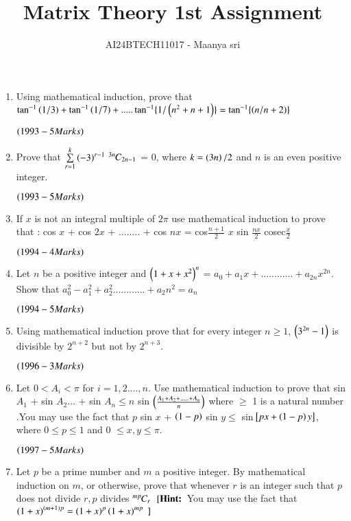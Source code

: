 \documentclass[journal,12pt,twocolumn]{IEEEtran}
\theoremstyle{remark}
\begin{document}

\vspace{3cm}

\title{Matrix Theory 1st Assignment}
\author{AI24BTECH11017 - Maanya sri}
\maketitle
\newpage
\bigskip

\renewcommand{\thefigure}{\theenumi}
\renewcommand{\thetable}{\theenumi}\begin{enumerate}[start=16] 
\item Using mathematical induction, prove that $\tan^{-1}\left(1/3\right)  +  \tan^{-1}\left(1/7\right) + .....\tan^{-1}\{1/\left(n^2 + n + 1\right)\} = \tan^{-1}\{\left(n/n+2\right)\}$ 

$\hfill\textcolor{black}{\brak{1993-5 Marks} }$
\item Prove that $\sum\limits^{k}_{r=1} \left(-3\right)^{r-1}$ ${{}^{3n}\mkern-1muC_{2n-1}}$ = $0$, where $k=\left(3n\right)/2$ and $n$ is an even positive integer.

$\hfill\textcolor{black}{\brak{1993-5 Marks} }$
\item If $x$ is not an integral multiple of $2\pi$ use mathematical induction to prove that : 
cos $x$ + cos $2x$ + ........ + cos $nx$ = cos$\frac{n+1}{2}$ $x$ sin $\frac{nx}{2}$ cosec$\frac{x}{2}$

$\hfill\textcolor{black}{\brak{1994-4 Marks}}$
\item 
Let $n$ be a positive integer and $\left(1+x+x^2\right)^n$ = $a_0 + a_1 x + ............+ a_{2n} x^{2n}$. Show that $a_0^2 - a_1^2 + a_2^2 ............ + a_2n^2 = a_n$

$\hfill\textcolor{black}{\brak{1994-5 Marks} }$
\item 
Using mathematical induction prove that for every integer $n \geq 1$, $\left(3^{2n} -1\right)$ is divisible by $2^{n+2}$ but not by $2^{n+3}$.

$\hfill\textcolor{black}{\brak{1996-3 Marks} }$
\item 
Let $ 0<A_i<\pi$ for $i= 1,2....,n$. Use mathematical induction to prove that sin $A_1$ + sin $A_2$... + sin $A_n \leq  n$  sin $\left(\frac{A_1 + A_2 +.....+ A_n}{n}\right)$ where $\geq$ 1 is a natural number .\lcbrak{}You may use the fact that $p$ sin $x$ + $\left(1-p\right)$ sin $y\leq$ sin${}\left[px + \left(1-p\right)y\right]$, where $0 \leq p \leq 1 $ and 0 $\leq x,y \leq \pi $.\rcbrak{}

$\hfill\textcolor{black}{\brak{1997-5 Marks} }$\item 
Let $p$ be a prime number and $m$ a positive integer. By mathematical induction on $m$, or otherwise, prove that whenever $r$ is an integer such that $p$ does not divide $r , p$ divides ${{}^{mp}\mkern-1muC_{r}}$
${}\left[\textbf{Hint:}\right.$ You may use the fact that $\left(1+x\right)^{\left(m+1\right)p} = \left(1+x\right)^p\left(1+x\right)^ {mp} {}\left.\right]$


\end{enumerate}
\end{document}
